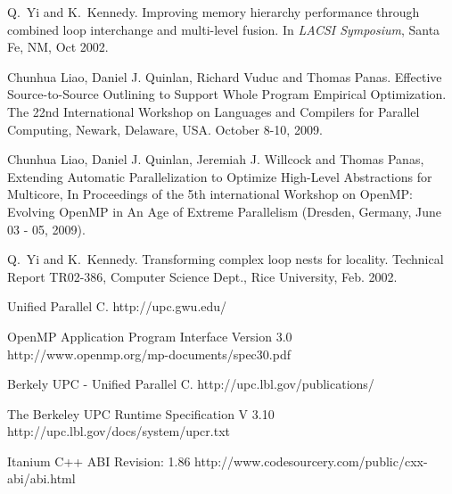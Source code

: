 \begin{thebibliography}{WW}
Q.~Yi and K.~Kennedy.
\newblock Improving memory hierarchy performance through combined loop
  interchange and multi-level fusion.
\newblock In {\em LACSI Symposium}, Santa Fe, NM, Oct 2002.

Chunhua Liao, Daniel J. Quinlan, Richard Vuduc and Thomas Panas.
\newblock Effective Source-to-Source Outlining to Support Whole Program
Empirical Optimization.
\newblock The 22nd International Workshop on Languages and Compilers for Parallel Computing, Newark, Delaware, USA. October 8-10, 2009.

Chunhua Liao, Daniel J. Quinlan, Jeremiah J. Willcock and Thomas Panas,
\newblock Extending Automatic Parallelization to Optimize High-Level
Abstractions for Multicore,
\newblock In Proceedings of the 5th international Workshop on OpenMP:
Evolving OpenMP in An Age of Extreme Parallelism (Dresden, Germany, June 03
- 05, 2009).


Q.~Yi and K.~Kennedy.
\newblock Transforming complex loop nests for locality.
\newblock Technical Report TR02-386, Computer Science Dept., Rice University,
  Feb. 2002.

\newblock Unified Parallel C.
\newblock http://upc.gwu.edu/

\newblock OpenMP Application Program Interface Version 3.0
\newblock http://www.openmp.org/mp-documents/spec30.pdf

\newblock Berkely UPC - Unified Parallel C.
\newblock http://upc.lbl.gov/publications/

\newblock The Berkeley UPC Runtime Specification V 3.10
\newblock http://upc.lbl.gov/docs/system/upcr.txt

\newblock Itanium C++ ABI Revision: 1.86
\newblock http://www.codesourcery.com/public/cxx-abi/abi.html

\end{thebibliography}





